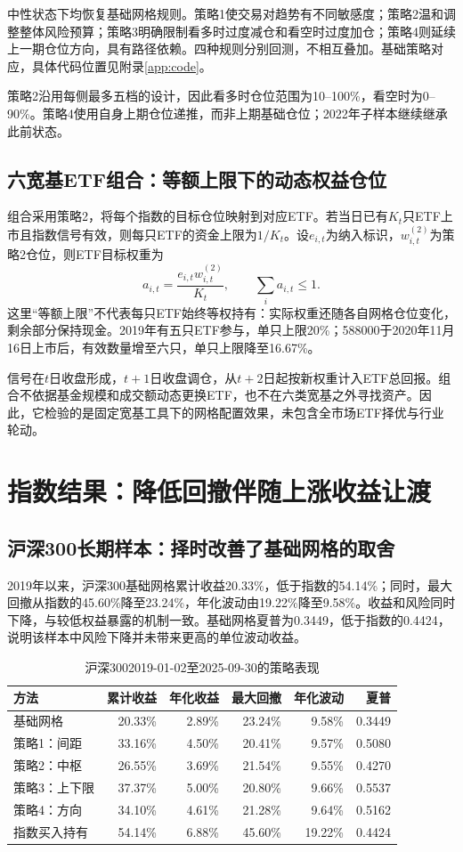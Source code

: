 \documentclass[UTF8,a4paper,11pt,fontset=fandol]{ctexart}
\newcommand{\code}[1]{\texttt{\detokenize{#1}}}
\begin{document}
中性状态下均恢复基础网格规则。策略1使交易对趋势有不同敏感度；策略2温和调整整体风险预算；策略3明确限制看多时过度减仓和看空时过度加仓；策略4则延续上一期仓位方向，具有路径依赖。四种规则分别回测，不相互叠加。基础策略对应\code{w_base}，具体代码位置见附录\ref{app:code}。

策略2沿用每侧最多五档的设计，因此看多时仓位范围为10--100\%，看空时为0--90\%。策略4使用自身上期仓位递推，而非上期基础仓位；2022年子样本继续继承此前状态。

\subsection{六宽基ETF组合：等额上限下的动态权益仓位}
组合采用策略2，将每个指数的目标仓位映射到对应ETF。若当日已有$K_t$只ETF上市且指数信号有效，则每只ETF的资金上限为$1/K_t$。设$e_{i,t}$为纳入标识，$w_{i,t}^{(2)}$为策略2仓位，则ETF目标权重为
\[
a_{i,t}=\frac{e_{i,t}w_{i,t}^{(2)}}{K_t},\qquad \sum_i a_{i,t}\leq1.
\]
这里“等额上限”不代表每只ETF始终等权持有：实际权重还随各自网格仓位变化，剩余部分保持现金。2019年有五只ETF参与，单只上限20\%；588000于2020年11月16日上市后，有效数量增至六只，单只上限降至16.67\%。

信号在$t$日收盘形成，$t+1$日收盘调仓，从$t+2$日起按新权重计入ETF总回报。组合不依据基金规模和成交额动态更换ETF，也不在六类宽基之外寻找资产。因此，它检验的是固定宽基工具下的网格配置效果，未包含全市场ETF择优与行业轮动。

\clearpage
\section{指数结果：降低回撤伴随上涨收益让渡}
\subsection{沪深300长期样本：择时改善了基础网格的取舍}
2019年以来，沪深300基础网格累计收益20.33\%，低于指数的54.14\%；同时，最大回撤从指数的45.60\%降至23.24\%，年化波动由19.22\%降至9.58\%。收益和风险同时下降，与较低权益暴露的机制一致。基础网格夏普为0.3449，低于指数的0.4424，说明该样本中风险下降并未带来更高的单位波动收益。

\begin{table}[htbp]\centering\small
\caption{沪深3002019-01-02至2025-09-30的策略表现}
\begin{tabular}{lrrrrr}\toprule
方法 & 累计收益 & 年化收益 & 最大回撤 & 年化波动 & 夏普\\\midrule
基础网格 & 20.33\% & 2.89\% & 23.24\% & 9.58\% & 0.3449\\
策略1：间距 & 33.16\% & 4.50\% & 20.41\% & 9.57\% & 0.5080\\
策略2：中枢 & 26.55\% & 3.69\% & 21.54\% & 9.55\% & 0.4270\\
策略3：上下限 & 37.37\% & 5.00\% & 20.80\% & 9.66\% & 0.5537\\
策略4：方向 & 34.10\% & 4.61\% & 21.28\% & 9.64\% & 0.5162\\
指数买入持有 & 54.14\% & 6.88\% & 45.60\% & 19.22\% & 0.4424\\\bottomrule
\end{tabular}
\end{table}
\end{document}
